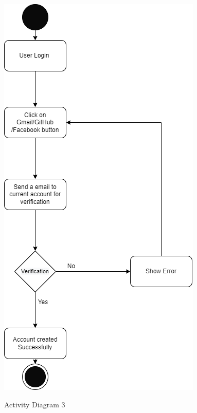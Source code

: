 \begin{figure}[H]
    \centering
    \caption{Activity Diagram 3}
    \includegraphics[scale=0.5]{./diagrams/Activity Diagram/ad-03.png}
    \label{fig:act-03}

\end{figure}


